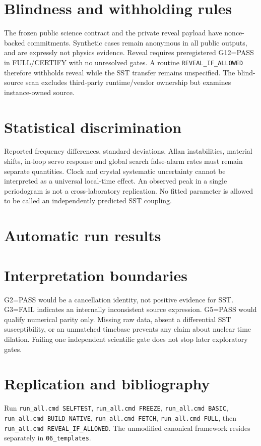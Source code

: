 \documentclass[11pt,a4paper]{article}
\begin{document}
\section{Blindness and withholding rules}
The frozen public science contract and the private reveal payload have nonce-backed commitments. Synthetic cases remain anonymous in all public outputs, and are expressly not physics evidence. Reveal requires preregistered G12=PASS in FULL/CERTIFY with no unresolved gates. A routine \texttt{REVEAL\_IF\_ALLOWED} therefore withholds reveal while the SST transfer remains unspecified. The blind-source scan excludes third-party runtime/vendor ownership but examines instance-owned source.
\section{Statistical discrimination}
Reported frequency differences, standard deviations, Allan instabilities, material shifts, in-loop servo response and global search false-alarm rates must remain separate quantities. Clock and crystal systematic uncertainty cannot be interpreted as a universal local-time effect. An observed peak in a single periodogram is not a cross-laboratory replication. No fitted parameter is allowed to be called an independently predicted SST coupling.
\section{Automatic run results}
\section{Interpretation boundaries}
G2=PASS would be a cancellation identity, not positive evidence for SST. G3=FAIL indicates an internally inconsistent source expression. G5=PASS would qualify numerical parity only. Missing raw data, absent a differential SST susceptibility, or an unmatched timebase prevents any claim about nuclear time dilation. Failing one independent scientific gate does not stop later exploratory gates.
\section{Replication and bibliography}
Run \texttt{run\_all.cmd SELFTEST}, \texttt{run\_all.cmd FREEZE}, \texttt{run\_all.cmd BASIC}, \texttt{run\_all.cmd BUILD\_NATIVE}, \texttt{run\_all.cmd FETCH}, \texttt{run\_all.cmd FULL}, then \texttt{run\_all.cmd REVEAL\_IF\_ALLOWED}. The unmodified canonical framework resides separately in \texttt{06\_templates}.
\end{document}
